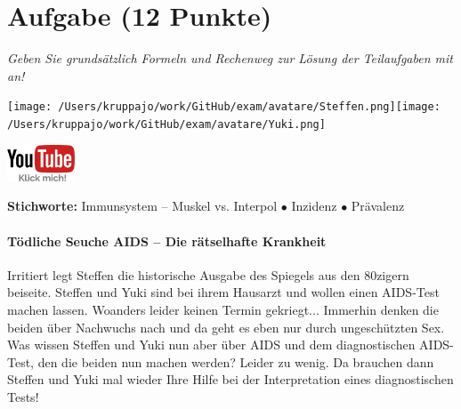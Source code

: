 \documentclass[a4paper, 9pt]{scrartcl}\usepackage[]{graphicx}\usepackage[]{xcolor}
\begin{document}
 
\clearpage

\section{Aufgabe \hfill (12 Punkte)}

\textit{Geben Sie grundsätzlich Formeln und Rechenweg zur Lösung der Teilaufgaben mit an!} \\[1Ex]
 

 
\ifcollection
\begin{flushright}
\tiny\vspace{-3Ex}
\textbf{\examinhaltstart}
\exammodulemathstat
\vspace{-4Ex}
\end{flushright}
\begin{minipage}[t]{0.5\textwidth}
\texttt{[image: /Users/kruppajo/work/GitHub/exam/avatare/Steffen.png]}\hspace{-4mm}\texttt{[image: /Users/kruppajo/work/GitHub/exam/avatare/Yuki.png]}
\end{minipage}
\begin{minipage}[t]{0.5\textwidth}
\hfill
\href{https://youtu.be/flRBo1FWQy0}{\includegraphics[width = 2cm]{img/youtube}}
\end{minipage}
\fi

{\tiny\textbf{Stichworte:} Immunsystem -- Muskel vs. Interpol $\bullet$ Inzidenz $\bullet$ Prävalenz}




\ifcollection
\paragraph{Tödliche Seuche AIDS -- Die rätselhafte Krankheit}
\fi



Irritiert legt Steffen die historische Ausgabe des Spiegels aus den 80zigern beiseite. Steffen und Yuki sind bei ihrem Hausarzt und wollen einen AIDS-Test machen lassen. Woanders leider keinen Termin gekriegt... Immerhin denken die beiden über Nachwuchs nach und da geht es eben nur durch ungeschützten Sex. Was wissen Steffen und Yuki nun aber über AIDS und dem diagnostischen AIDS-Test, den die beiden nun machen werden? Leider zu wenig. Da brauchen dann Steffen und Yuki mal wieder Ihre Hilfe bei der Interpretation eines diagnostischen Tests!\\
\end{document}
